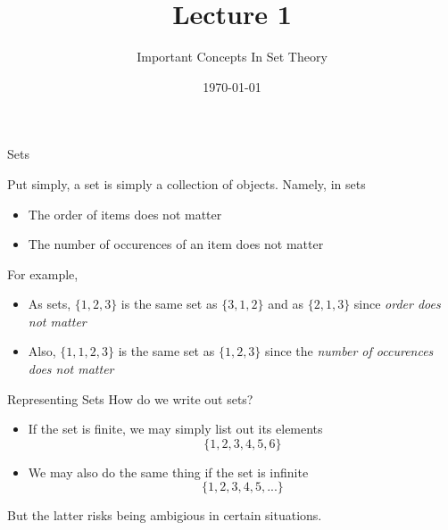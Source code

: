 \documentclass{beamer}
\title{Lecture 1}
\subtitle{Important Concepts In Set Theory}
\author{}
\date{\today}
\begin{document}
		\maketitle

		\begin{frame}{Sets}
				\begin{definition}[Sets]
						Put simply, a \alert{set} is simply a collection of objects. Namely, in sets
						\begin{itemize}
								\item The order of items does not matter 
								\item The number of occurences of an item does not matter
						\end{itemize}
				\end{definition}
				For example, 
				\begin{itemize}
						\item As sets, $\{1, 2, 3\}$ is the same set as $\{3, 1, 2\}$ and as $\{2, 1, 3\}$ since \emph{order does not matter}
						\item Also, $\{1, 1, 2, 3\}$ is the same set as $\{1, 2, 3\}$ since the \emph{number of occurences does not matter}
				\end{itemize}
		\end{frame}

		\begin{frame}{Representing Sets}
				How do we write out sets? 
				\begin{itemize}
						\item If the set is finite, we may simply list out its elements 
								\begin{equation*}
										\{1, 2, 3, 4, 5, 6\}
								\end{equation*}
						\item We may also do the same thing if the set is infinite 
								\begin{equation*}
										\{1, 2, 3, 4, 5, ...\}
								\end{equation*}
				\end{itemize}
				But the latter risks being ambigious in certain situations. 
		\end{frame}
\end{document}

